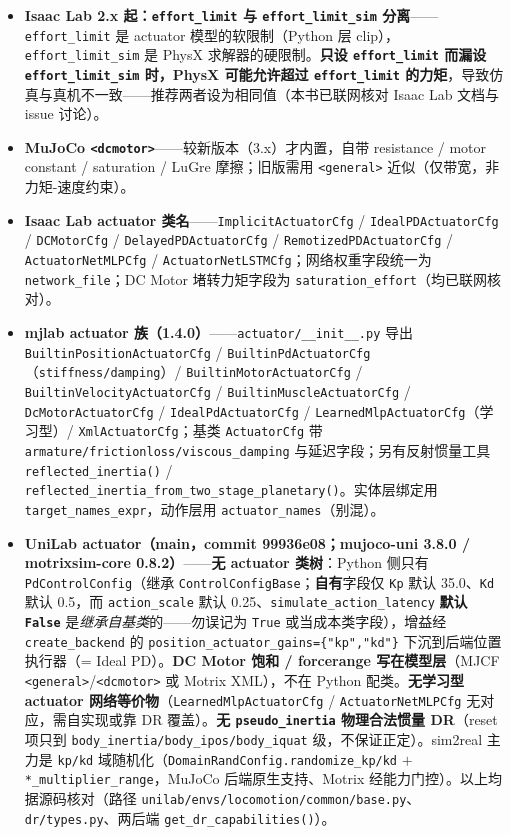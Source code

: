 \begin{itemize}
  \item \textbf{Isaac Lab 2.x 起：\texttt{effort\_limit} 与 \texttt{effort\_limit\_sim} 分离}——\verb|effort_limit| 是 actuator 模型的软限制（Python 层 clip），\verb|effort_limit_sim| 是 PhysX 求解器的硬限制。\textbf{只设 \texttt{effort\_limit} 而漏设 \texttt{effort\_limit\_sim} 时，PhysX 可能允许超过 \texttt{effort\_limit} 的力矩}，导致仿真与真机不一致——推荐两者设为相同值（本书已联网核对 Isaac Lab 文档与 issue 讨论）。
  \item \textbf{MuJoCo \texttt{<dcmotor>}}——较新版本（3.x）才内置，自带 resistance / motor constant / saturation / LuGre 摩擦；旧版需用 \verb|<general>| 近似（仅带宽，非力矩-速度约束）。
  \item \textbf{Isaac Lab actuator 类名}——\verb|ImplicitActuatorCfg| / \verb|IdealPDActuatorCfg| / \verb|DCMotorCfg| / \verb|DelayedPDActuatorCfg| / \verb|RemotizedPDActuatorCfg| / \verb|ActuatorNetMLPCfg| / \verb|ActuatorNetLSTMCfg|；网络权重字段统一为 \verb|network_file|；DC Motor 堵转力矩字段为 \verb|saturation_effort|（均已联网核对）。
  \item \textbf{mjlab actuator 族（1.4.0）}——\verb|actuator/__init__.py| 导出 \verb|BuiltinPositionActuatorCfg| / \verb|BuiltinPdActuatorCfg|（\verb|stiffness/damping|）/ \verb|BuiltinMotorActuatorCfg| / \verb|BuiltinVelocityActuatorCfg| / \verb|BuiltinMuscleActuatorCfg| / \verb|DcMotorActuatorCfg| / \verb|IdealPdActuatorCfg| / \verb|LearnedMlpActuatorCfg|（学习型）/ \verb|XmlActuatorCfg|；基类 \verb|ActuatorCfg| 带 \verb|armature/frictionloss/viscous_damping| 与延迟字段；另有反射惯量工具 \verb|reflected_inertia()| / \verb|reflected_inertia_from_two_stage_planetary()|。实体层绑定用 \verb|target_names_expr|，动作层用 \verb|actuator_names|（别混）。
  \item \textbf{UniLab actuator（main，commit 99936e08；mujoco-uni 3.8.0 / motrixsim-core 0.8.2）}——\textbf{无 actuator 类树}：Python 侧只有 \verb|PdControlConfig|（继承 \verb|ControlConfigBase|；\textbf{自有}字段仅 \verb|Kp| 默认 35.0、\verb|Kd| 默认 0.5，而 \verb|action_scale| 默认 0.25、\verb|simulate_action_latency| \textbf{默认 \texttt{False}} 是\emph{继承自基类}的——勿误记为 \verb|True| 或当成本类字段），增益经 \verb|create_backend| 的 \verb|position_actuator_gains={"kp","kd"}| 下沉到后端位置执行器（= Ideal PD）。\textbf{DC Motor 饱和 / forcerange 写在模型层}（MJCF \verb|<general>|/\verb|<dcmotor>| 或 Motrix XML），不在 Python 配类。\textbf{无学习型 actuator 网络等价物}（\verb|LearnedMlpActuatorCfg| / \verb|ActuatorNetMLPCfg| 无对应，需自实现或靠 DR 覆盖）。\textbf{无 \texttt{pseudo\_inertia} 物理合法惯量 DR}（reset 项只到 \verb|body_inertia/body_ipos/body_iquat| 级，不保证正定）。sim2real 主力是 \verb|kp/kd| 域随机化（\verb|DomainRandConfig.randomize_kp/kd| $+$ \verb|*_multiplier_range|，MuJoCo 后端原生支持、Motrix 经能力门控）。以上均据源码核对（路径 \verb|unilab/envs/locomotion/common/base.py|、\verb|dr/types.py|、两后端 \verb|get_dr_capabilities()|）。
\end{itemize}
